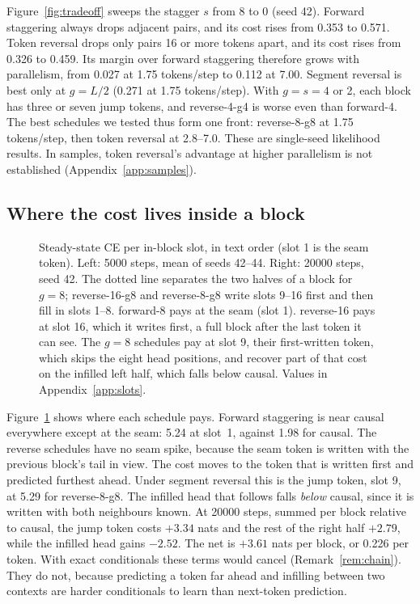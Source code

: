 \documentclass[11pt]{article}
\theoremstyle{definition}
\theoremstyle{remark}
\newcommand{\sch}[1]{\textsf{#1}}
\begin{document}
Figure~\ref{fig:tradeoff} sweeps the stagger $s$ from 8 to 0 (seed 42).
Forward staggering always drops adjacent pairs, and its cost rises from 0.353 to 0.571.
Token reversal drops only pairs 16 or more tokens apart, and its cost rises from 0.326 to 0.459.
Its margin over forward staggering therefore grows with parallelism, from 0.027 at 1.75 tokens/step to 0.112 at 7.00.
Segment reversal is best only at $g=L/2$ (0.271 at 1.75 tokens/step).
With $g=s=4$ or 2, each block has three or seven jump tokens, and \sch{reverse-4-g4} is worse even than \sch{forward-4}.
The best schedules we tested thus form one front: \sch{reverse-8-g8} at 1.75 tokens/step, then token reversal at 2.8--7.0.
These are single-seed likelihood results.
In samples, token reversal's advantage at higher parallelism is not established (Appendix~\ref{app:samples}).

\subsection{Where the cost lives inside a block}

\begin{figure}[t]
  \centering
  
  \caption{Steady-state CE per in-block slot, in text order (slot 1 is the seam token). Left: 5000 steps, mean of seeds 42--44. Right: 20000 steps, seed 42. The dotted line separates the two halves of a block for $g=8$; \sch{reverse-16-g8} and \sch{reverse-8-g8} write slots 9--16 first and then fill in slots 1--8. \sch{forward-8} pays at the seam (slot 1). \sch{reverse-16} pays at slot 16, which it writes first, a full block after the last token it can see. The $g=8$ schedules pay at slot 9, their first-written token, which skips the eight head positions, and recover part of that cost on the infilled left half, which falls below causal. Values in Appendix~\ref{app:slots}.}
  \label{fig:slots}
\end{figure}

Figure~\ref{fig:slots} shows where each schedule pays.
Forward staggering is near causal everywhere except at the seam: 5.24 at slot~1, against 1.98 for \sch{causal}.
The reverse schedules have no seam spike, because the seam token is written with the previous block's tail in view.
The cost moves to the token that is written first and predicted furthest ahead.
Under segment reversal this is the jump token, slot 9, at 5.29 for \sch{reverse-8-g8}.
The infilled head that follows falls \emph{below} causal, since it is written with both neighbours known.
At 20000 steps, summed per block relative to causal, the jump token costs $+3.34$ nats and the rest of the right half $+2.79$, while the infilled head gains $-2.52$.
The net is $+3.61$ nats per block, or 0.226 per token.
With exact conditionals these terms would cancel (Remark~\ref{rem:chain}).
They do not, because predicting a token far ahead and infilling between two contexts are harder conditionals to learn than next-token prediction.
\end{document}
